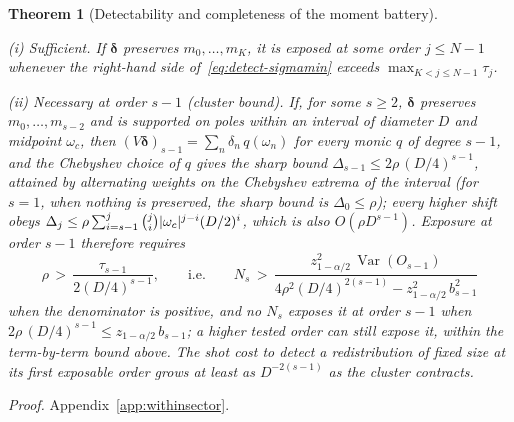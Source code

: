 \documentclass[submission, PhysCore]{SciPost}
\newtheorem{theorem}{Theorem}
\begin{document}
\begin{theorem}[Detectability and completeness of the moment battery]
\begin{enumerate}
\par\emph{(i) Sufficient.} If $\bm{\delta}$ preserves $m_0,\dots,m_K$, it is exposed at some order $j\le N-1$ whenever the right-hand side of~\eqref{eq:detect-sigmamin} exceeds $\max_{K<j\le N-1}\tau_j$.
\par\emph{(ii) Necessary at order $s-1$ (cluster bound).} If, for some $s\ge2$, $\bm{\delta}$ preserves $m_0,\dots,m_{s-2}$ and is supported on poles within an interval of diameter $D$ and midpoint $\omega_c$, then $(V\bm{\delta})_{s-1}=\sum_n\delta_n\,q(\omega_n)$ for every monic $q$ of degree $s-1$, and the Chebyshev choice of $q$ gives the sharp bound $\Delta_{s-1}\le2\rho\,(D/4)^{s-1}$, attained by alternating weights on the Chebyshev extrema of the interval (for $s=1$, when nothing is preserved, the sharp bound is $\Delta_0\le\rho$); every higher shift obeys $\Delta_j\le\rho\sum\nolimits_{i=s-1}^{j}\tbinom{j}{i}|\omega_c|^{j-i}(D/2)^{i}$, which is also $O(\rho D^{s-1})$. Exposure at order $s-1$ therefore requires
\begin{equation}
\rho\,>\,\frac{\tau_{s-1}}{2(D/4)^{s-1}},\qquad\text{i.e.}\qquad N_s\,>\,\frac{z_{1-\alpha/2}^{2}\,\operatorname{Var}(O_{s-1})}{4\rho^2(D/4)^{2(s-1)}-z_{1-\alpha/2}^2\,b_{s-1}^2}
\label{eq:detect-Ns}
\end{equation}
when the denominator is positive, and no $N_s$ exposes it at order $s-1$ when $2\rho\,(D/4)^{s-1}\le z_{1-\alpha/2}\,b_{s-1}$; a higher tested order can still expose it, within the term-by-term bound above. The shot cost to detect a redistribution of fixed size at its first exposable order grows at least as $D^{-2(s-1)}$ as the cluster contracts.
\end{enumerate}
\end{theorem}

\noindent\emph{Proof.} Appendix~\ref{app:withinsector}.
\end{document}

